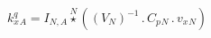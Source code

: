 \documentclass[border=2pt]{standalone}
\begin{document}
${{k^q_x}}{_{A}}={{I}}{_{N, A}} \stackrel{N}{\star} \left(\left( {V}{_{N}} \right)^{-1} \, . \, {{C_p}}{_{N}} \, . \, {{v_x}}{_{N}}\right)$
\end{document}

